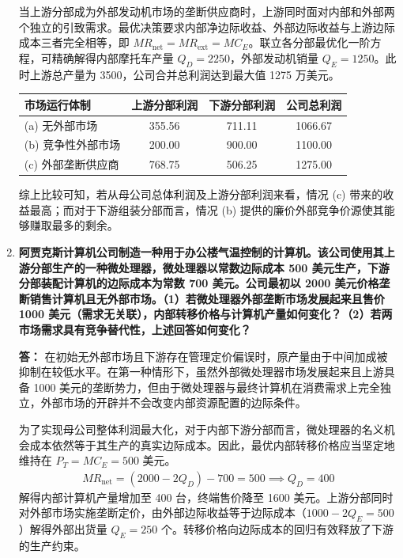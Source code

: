 \begin{enumerate}[label=\textbf{\arabic*.}, leftmargin=*]
		当上游分部成为外部发动机市场的垄断供应商时，上游同时面对内部和外部两个独立的引致需求。最优决策要求内部净边际收益、外部边际收益与上游边际成本三者完全相等，即 $MR_{\text{net}} = MR_{\text{ext}} = MC_E$。联立各分部最优化一阶方程，可精确解得内部摩托车产量 $Q_D = 2250$，外部发动机销量 $Q_E = 1250$。此时上游总产量为 3500，公司合并总利润达到最大值 1275 万美元。
		
		\begin{center}
			\small
			\renewcommand{\arraystretch}{1.3}
			\setlength{\tabcolsep}{4pt}
			\begin{tabular}{|l|c|c|c|}
				\hline
				\textbf{市场运行体制} & \textbf{上游分部利润} & \textbf{下游分部利润} & \textbf{公司总利润} \\
				\hline
				(a) 无外部市场 & 355.56 & 711.11 & 1066.67 \\
				(b) 竞争性外部市场 & 200.00 & 900.00 & 1100.00 \\
				(c) 外部垄断供应商 & 768.75 & 506.25 & 1275.00 \\
				\hline
			\end{tabular}
		\end{center}
		综上比较可知，若从母公司总体利润及上游分部利润来看，情况 (c) 带来的收益最高；而对于下游组装分部而言，情况 (b) 提供的廉价外部竞争价源使其能够赚取最多的剩余。
		\newpage
		\item \textbf{阿贾克斯计算机公司制造一种用于办公楼气温控制的计算机。该公司使用其上游分部生产的一种微处理器，微处理器以常数边际成本 500 美元生产，下游分部装配计算机的边际成本为常数 700 美元。公司最初以 2000 美元价格垄断销售计算机且无外部市场。（1）若微处理器外部垄断市场发展起来且售价 1000 美元（需求无关联），内部转移价格与计算机产量如何变化？（2）若两市场需求具有竞争替代性，上述回答如何变化？}
		
		\textbf{答：}
		在初始无外部市场且下游存在管理定价偏误时，原产量由于中间加成被抑制在较低水平。在第一种情形下，虽然外部微处理器市场发展起来且上游具备 1000 美元的垄断势力，但由于微处理器与最终计算机在消费需求上完全独立，外部市场的开辟并不会改变内部资源配置的边际条件。
		
		为了实现母公司整体利润最大化，对于内部下游分部而言，微处理器的名义机会成本依然等于其生产的真实边际成本。因此，最优内部转移价格应当坚定地维持在 $P_T = MC_E = 500$ 美元。
		\[
		\begin{aligned}
			MR_{\text{net}} = (2000 - 2Q_D) - 700 = 500 \implies Q_D = 400
		\end{aligned}
		\]
		解得内部计算机产量增加至 400 台，终端售价降至 1600 美元。上游分部同时对外部市场实施垄断定价，由外部边际收益等于边际成本（$1000 - 2Q_E = 500$）解得外部出货量 $Q_E = 250$ 个。转移价格向边际成本的回归有效释放了下游的生产约束。
		

\end{enumerate}
